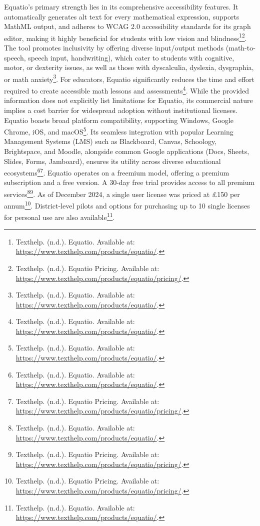 Equatio's primary strength lies in its comprehensive accessibility features. It automatically generates alt text for every mathematical expression, supports MathML output, and adheres to WCAG 2.0 accessibility standards for its graph editor, making it highly beneficial for students with low vision and blindness\footnote{Texthelp. (n.d.). Equatio. Available at: \url{https://www.texthelp.com/products/equatio/}.}\footnote{Texthelp. (n.d.). Equatio Pricing. Available at: \url{https://www.texthelp.com/products/equatio/pricing/}.}. The tool promotes inclusivity by offering diverse input/output methods (math-to-speech, speech input, handwriting), which cater to students with cognitive, motor, or dexterity issues, as well as those with dyscalculia, dyslexia, dysgraphia, or math anxiety\footnote{Texthelp. (n.d.). Equatio. Available at: \url{https://www.texthelp.com/products/equatio/}.}. For educators, Equatio significantly reduces the time and effort required to create accessible math lessons and assessments\footnote{Texthelp. (n.d.). Equatio. Available at: \url{https://www.texthelp.com/products/equatio/}.}. While the provided information does not explicitly list limitations for Equatio, its commercial nature implies a cost barrier for widespread adoption without institutional licenses. Equatio boasts broad platform compatibility, supporting Windows, Google Chrome, iOS, and macOS\footnote{Texthelp. (n.d.). Equatio. Available at: \url{https://www.texthelp.com/products/equatio/}.}. Its seamless integration with popular Learning Management Systems (LMS) such as Blackboard, Canvas, Schoology, Brightspace, and Moodle, alongside common Google applications (Docs, Sheets, Slides, Forms, Jamboard), ensures its utility across diverse educational ecosystems\footnote{Texthelp. (n.d.). Equatio. Available at: \url{https://www.texthelp.com/products/equatio/}.}\footnote{Texthelp. (n.d.). Equatio Pricing. Available at: \url{https://www.texthelp.com/products/equatio/pricing/}.}. Equatio operates on a freemium model, offering a premium subscription and a free version. A 30-day free trial provides access to all premium services\footnote{Texthelp. (n.d.). Equatio. Available at: \url{https://www.texthelp.com/products/equatio/}.}\footnote{Texthelp. (n.d.). Equatio Pricing. Available at: \url{https://www.texthelp.com/products/equatio/pricing/}.}. As of December 2024, a single user license was priced at £150 per annum\footnote{Texthelp. (n.d.). Equatio Pricing. Available at: \url{https://www.texthelp.com/products/equatio/pricing/}.}. District-level pilots and options for purchasing up to 10 single licenses for personal use are also available\footnote{Texthelp. (n.d.). Equatio. Available at: \url{https://www.texthelp.com/products/equatio/}.}.

